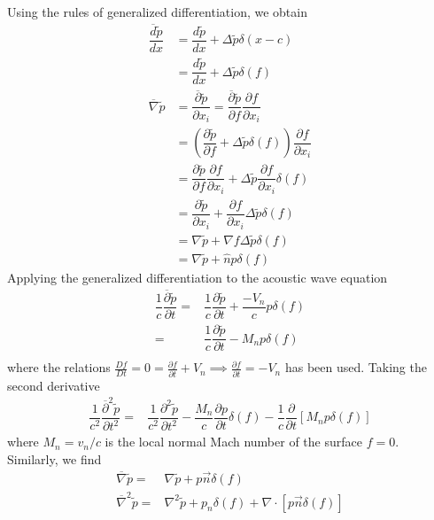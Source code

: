 \documentclass[onecolumn,10pt]{jhwhw}
\begin{document}
Using the rules of generalized differentiation, we obtain
\begin{align*}
\dfrac{\overline{d}\widetilde{p}}{dx}
    &= \dfrac{d\widetilde{p}}{dx} + \Delta\widetilde{p} \delta(x - c) \\
    &= \dfrac{d\widetilde{p}}{dx} + \Delta\widetilde{p} \delta(f) \\
\overline{\nabla} \widetilde{p}
&= \dfrac{\overline{\partial}\widetilde{p}}{\partial x_i}
= \dfrac{\overline{\partial}\widetilde{p}}{\partial f}
    \dfrac{\partial f}{\partial x_i} \\
&= \left( \dfrac{\partial\widetilde{p}}{\partial f}
    + \Delta \widetilde{p} \delta(f) \right)
    \dfrac{\partial f}{\partial x_i} \\
&= \dfrac{\partial\widetilde{p}}{\partial f} \dfrac{\partial f}{\partial x_i}
    + \Delta \widetilde{p} \dfrac{\partial f}{\partial x_i} \delta(f) \\
&= \dfrac{\partial\widetilde{p}}{\partial x_i}
    + \dfrac{\partial f}{\partial x_i} \Delta \widetilde{p} \delta(f) \\
&= \nabla\widetilde{p} + \nabla f \Delta\widetilde{p} \delta(f) \\
&= \nabla\widetilde{p} + \hat{n} p \delta(f)
\end{align*}
Applying the generalized differentiation to the acoustic wave equation
\begin{align*}
\dfrac{1}{c} \dfrac{\overline{\partial} \widetilde{p}}{\partial t} =& \dfrac{1}{c} \dfrac{\partial \widetilde{p}}{\partial t} + \dfrac{-V_n}{c} p \delta (f) \\
=& \dfrac{1}{c} \dfrac{\partial \widetilde{p}}{\partial t} - M_n p \delta (f) \\
\end{align*}
where the relations $\frac{D f}{D t} = 0 = \frac{\partial f}{\partial t} + V_n \implies \frac{\partial f}{\partial t} = -V_n$ has been used. Taking the second derivative
\begin{align*}
\dfrac{1}{c^2} \dfrac{\overline{\partial}^2 \widetilde{p}}{\partial t^2} =& \dfrac{1}{c^2} \dfrac{\partial^2 \widetilde{p}}{\partial t^2}
- \dfrac{M_n}{c} \dfrac{\partial p}{\partial t} \delta (f)
-\dfrac{1}{c} \dfrac{\partial}{\partial t} [M_n p \delta (f)]
\end{align*}
where $M_n = v_n/c$ is the local normal Mach number of the surface $f=0$. Similarly, we find
\begin{align*}
\overline{\nabla} \widetilde{p} =& \nabla \widetilde{p} + p \vec{n} \delta (f) \\
\overline{\nabla}^2 \widetilde{p} =& \nabla^2 \widetilde{p} + p_n \delta (f)
+ \nabla \cdot [p \vec{n} \delta (f)]
\end{align*}
\end{document}
